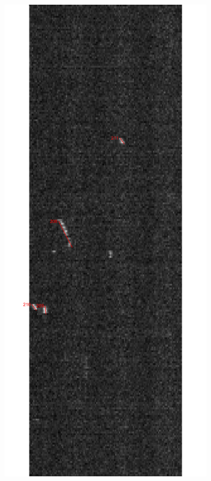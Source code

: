 \documentclass[english, %
parskip=full, %
bibliography=totoc, %
]{scrartcl}
\begin{document}
\begin{figure}[!ht]
	\centering
	\begin{subfigure}[b]{0.4\textwidth}
	   \includegraphics[width=\textwidth]{Auswertungsbild_oben}

\end{subfigure}
\end{figure}
\end{document}

